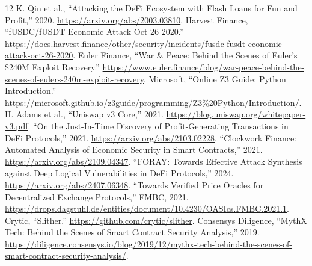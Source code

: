 \documentclass[conference]{IEEEtran}
\begin{document}
\begin{thebibliography}{12}
 K. Qin et al., ``Attacking the DeFi Ecosystem with Flash Loans for Fun and Profit,'' 2020. \url{https://arxiv.org/abs/2003.03810}.
 Harvest Finance, ``fUSDC/fUSDT Economic Attack Oct 26 2020.'' \url{https://docs.harvest.finance/other/security/incidents/fusdc-fusdt-economic-attack-oct-26-2020}.
 Euler Finance, ``War \& Peace: Behind the Scenes of Euler's \$240M Exploit Recovery.'' \url{https://www.euler.finance/blog/war-peace-behind-the-scenes-of-eulers-240m-exploit-recovery}.
 Microsoft, ``Online Z3 Guide: Python Introduction.'' \url{https://microsoft.github.io/z3guide/programming/Z3%20Python/Introduction/}.
 H. Adams et al., ``Uniswap v3 Core,'' 2021. \url{https://blog.uniswap.org/whitepaper-v3.pdf}.
 ``On the Just-In-Time Discovery of Profit-Generating Transactions in DeFi Protocols,'' 2021. \url{https://arxiv.org/abs/2103.02228}.
 ``Clockwork Finance: Automated Analysis of Economic Security in Smart Contracts,'' 2021. \url{https://arxiv.org/abs/2109.04347}.
 ``FORAY: Towards Effective Attack Synthesis against Deep Logical Vulnerabilities in DeFi Protocols,'' 2024. \url{https://arxiv.org/abs/2407.06348}.
 ``Towards Verified Price Oracles for Decentralized Exchange Protocols,'' FMBC, 2021. \url{https://drops.dagstuhl.de/entities/document/10.4230/OASIcs.FMBC.2021.1}.
 Crytic, ``Slither.'' \url{https://github.com/crytic/slither}.
 Consensys Diligence, ``MythX Tech: Behind the Scenes of Smart Contract Security Analysis,'' 2019. \url{https://diligence.consensys.io/blog/2019/12/mythx-tech-behind-the-scenes-of-smart-contract-security-analysis/}.
\end{thebibliography}
\end{document}
